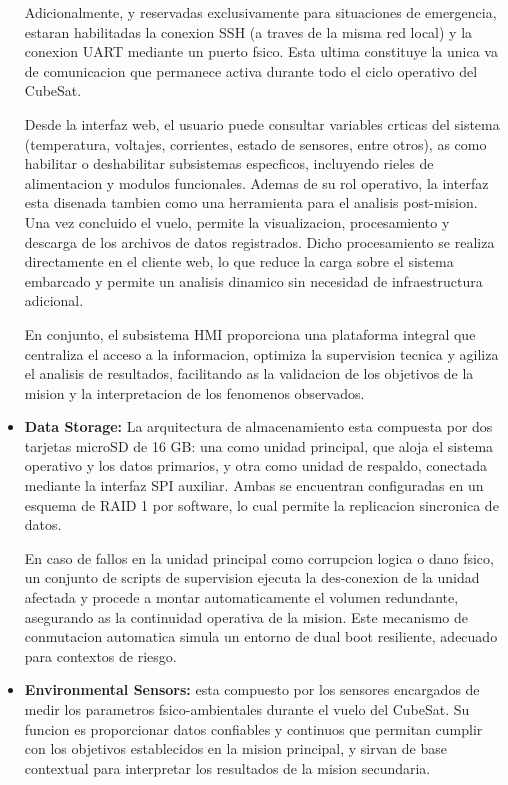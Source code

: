 \begin{itemize}
      Adicionalmente, y reservadas exclusivamente para situaciones de emergencia, estaran
      habilitadas la conexion SSH (a traves de la misma red local) y la conexion UART
      mediante un puerto fsico. Esta ultima constituye la unica va de comunicacion que
      permanece activa durante todo el ciclo operativo del CubeSat.

      Desde la interfaz web, el usuario puede consultar variables crticas del sistema (temperatura, voltajes,
      corrientes, estado de sensores, entre otros), as como habilitar o
      deshabilitar subsistemas especficos, incluyendo rieles de alimentacion y modulos funcionales.
      Ademas de su rol operativo, la interfaz esta disenada tambien como una herramienta
      para el analisis post-mision. Una vez concluido el vuelo, permite la visualizacion, procesamiento
      y descarga de los archivos de datos registrados. Dicho procesamiento se realiza
      directamente en el cliente web, lo que reduce la carga sobre el sistema embarcado y
      permite un analisis dinamico sin necesidad de infraestructura adicional.

      En conjunto, el subsistema HMI proporciona una plataforma integral que centraliza el
      acceso a la informacion, optimiza la supervision tecnica y agiliza el analisis de resultados,
      facilitando as la validacion de los objetivos de la mision y la interpretacion de los
      fenomenos observados.

      \item \textbf{Data Storage:} La arquitectura de almacenamiento esta compuesta por dos tarjetas
      microSD de 16 GB: una como unidad principal, que aloja el sistema operativo y los
      datos primarios, y otra como unidad de respaldo, conectada mediante la interfaz SPI
      auxiliar. Ambas se encuentran configuradas en un esquema de RAID 1 por software,
      lo cual permite la replicacion sincronica de datos.

      En caso de fallos en la unidad principal
      como corrupcion logica o dano fsico, un conjunto de scripts de supervision ejecuta
      la des-conexion de la unidad afectada y procede a montar automaticamente el volumen
      redundante, asegurando as la continuidad operativa de la mision. Este mecanismo de
      conmutacion automatica simula un entorno de dual boot resiliente, adecuado para
      contextos de riesgo.

      \item \textbf{Environmental Sensors:} esta compuesto por los sensores encargados de medir los
      parametros fsico-ambientales durante el vuelo del CubeSat. Su funcion es proporcionar
      datos confiables y continuos que permitan cumplir con los objetivos establecidos en la
      mision principal, y sirvan de base contextual para interpretar los resultados de la mision
      secundaria.


\end{itemize}
